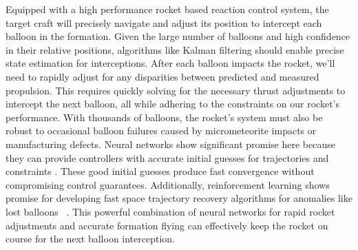 \documentclass{article}
\begin{document}
Equipped with a high performance rocket based reaction control system, the target craft will precisely navigate and adjust its position to intercept each balloon in the formation.   Given the large number of balloons and high confidence in their relative positions, algorithms like Kalman filtering should enable precise state estimation for interceptions. After each balloon impacts the rocket, we'll need to rapidly adjust for any disparities between predicted and measured propulsion. This requires quickly solving for the necessary thrust adjustments to intercept the next balloon, all while adhering to the constraints on our rocket's performance. With thousands of balloons, the rocket's system must also be robust to occasional balloon failures caused by micrometeorite impacts or manufacturing defects. Neural networks show significant promise here because they can provide controllers with accurate initial guesses for trajectories \cite{guffanti2024transformerstrajectoryoptimizationapplication} and constraints \cite{briden_constraint}.   These good initial guesses produce fast convergence without compromising control guarantees.   Additionally, reinforcement learning shows promise for developing fast space trajectory recovery algorithms for anomalies like lost balloons \ \cite{zavoli2021reinforcement}.   This powerful combination of neural networks for rapid rocket adjustments and accurate formation flying can effectively keep the rocket on course for the next balloon interception.
\end{document}
